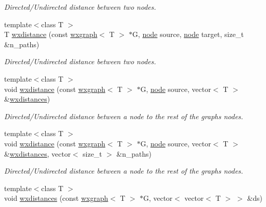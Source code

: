 \begin{DoxyCompactItemize}
\begin{DoxyCompactList}\small\item\em Directed/\+Undirected distance between two nodes. \end{DoxyCompactList}\item 
{\footnotesize template$<$class T $>$ }\\T \hyperlink{namespacelgraph_1_1traversal_a39a6c5e2fa275d28c02051dbbd934e39}{wxdistance} (const \hyperlink{classlgraph_1_1utils_1_1wxgraph}{wxgraph}$<$ T $>$ $\ast$G, \hyperlink{namespacelgraph_1_1utils_a7bd66ede3805ef121bc2835bd48de0cf}{node} source, \hyperlink{namespacelgraph_1_1utils_a7bd66ede3805ef121bc2835bd48de0cf}{node} target, size\+\_\+t \&n\+\_\+paths)
\begin{DoxyCompactList}\small\item\em Directed/\+Undirected distance between two nodes. \end{DoxyCompactList}\item 
{\footnotesize template$<$class T $>$ }\\void \hyperlink{namespacelgraph_1_1traversal_a386f294701634911e0c62fdbacb4a976}{wxdistance} (const \hyperlink{classlgraph_1_1utils_1_1wxgraph}{wxgraph}$<$ T $>$ $\ast$G, \hyperlink{namespacelgraph_1_1utils_a7bd66ede3805ef121bc2835bd48de0cf}{node} source, vector$<$ T $>$ \&\hyperlink{namespacelgraph_1_1traversal_a4d673389e0b2135edfb4fbf0e8dec386}{wxdistances})
\begin{DoxyCompactList}\small\item\em Directed/\+Undirected distance between a node to the rest of the graph\textquotesingle{}s nodes. \end{DoxyCompactList}\item 
{\footnotesize template$<$class T $>$ }\\void \hyperlink{namespacelgraph_1_1traversal_a7a1170b8673e281f64d4987c6986e41f}{wxdistance} (const \hyperlink{classlgraph_1_1utils_1_1wxgraph}{wxgraph}$<$ T $>$ $\ast$G, \hyperlink{namespacelgraph_1_1utils_a7bd66ede3805ef121bc2835bd48de0cf}{node} source, vector$<$ T $>$ \&\hyperlink{namespacelgraph_1_1traversal_a4d673389e0b2135edfb4fbf0e8dec386}{wxdistances}, vector$<$ size\+\_\+t $>$ \&n\+\_\+paths)
\begin{DoxyCompactList}\small\item\em Directed/\+Undirected distance between a node to the rest of the graph\textquotesingle{}s nodes. \end{DoxyCompactList}\item 
{\footnotesize template$<$class T $>$ }\\void \hyperlink{namespacelgraph_1_1traversal_a4d673389e0b2135edfb4fbf0e8dec386}{wxdistances} (const \hyperlink{classlgraph_1_1utils_1_1wxgraph}{wxgraph}$<$ T $>$ $\ast$G, vector$<$ vector$<$ T $>$ $>$ \&ds)

\end{DoxyCompactItemize}
